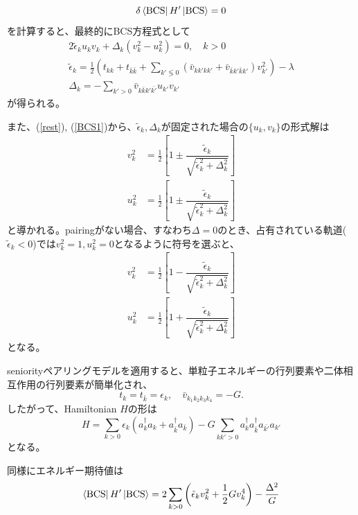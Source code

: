\documentclass[a4paper]{jsreport}
\newcommand{\BCSexp}[1]{\bra{\text{BCS}} {#1} \ket{\text{BCS}}}
\begin{document}
  \begin{equation}
      \delta\BCSexp{H'}=0
  \end{equation}
  を計算すると、最終的にBCS方程式として
  \begin{align}
      2\tilde{\epsilon}_ku_kv_k+\Delta_k(v_k^2-u_k^2)=0, \quad k>0\label{BCS1} \\
      \tilde{\epsilon}_k=\frac{1}{2}\left(t_{kk}+t_{\bar{k}\bar{k}}+\sum_{k'\lessgtr0}(\bar{v}_{kk'kk'}+\bar{v}_{\bar{k}k'\bar{k}k'})v_{k'}^2\right)-\lambda\\
      \Delta_k=-\sum_{k'>0}\bar{v}_{k\bar{k}k'\bar{k'}}u_{k'}v_{k'}\label{Delta1}
  \end{align}
  が得られる。\par
  また、(\ref{rest}), (\ref{BCS1})から、\(\tilde{\epsilon}_k, \Delta_k\)が固定された場合の\(\{u_k,v_k\}\)の形式解は
  \begin{align}
      v_k^2&=\frac{1}{2}\left[
        1\pm\dfrac{\tilde{\epsilon}_k}{\sqrt{\tilde{\epsilon}_k^2+\Delta_k^2}}
      \right]\\
      u_k^2&=\frac{1}{2}\left[
        1\pm\dfrac{\tilde{\epsilon}_k}{\sqrt{\tilde{\epsilon}_k^2+\Delta_k^2}}
      \right]
  \end{align}
  と導かれる。pairingがない場合、すなわち\(\Delta=0\)のとき、占有されている軌道(\(\tilde{\epsilon}_k<0\))では\(v_k^2=1, u_k^2=0\)となるように符号を選ぶと、
  \begin{align}
      v_k^2&=\frac{1}{2}\left[
        1-\dfrac{\tilde{\epsilon}_k}{\sqrt{\tilde{\epsilon}_k^2+\Delta_k^2}}
      \right]\\
      u_k^2&=\frac{1}{2}\left[
        1+\dfrac{\tilde{\epsilon}_k}{\sqrt{\tilde{\epsilon}_k^2+\Delta_k^2}}
      \right]
  \end{align}
  となる。\par
  seniorityペアリングモデルを適用すると、単粒子エネルギーの行列要素や二体相互作用の行列要素が簡単化され、
  \begin{equation}
      t_{k}=t_{\bar{k}}=\epsilon_k, \quad \bar{v}_{k_1k_2k_3k_4}=-G.
  \end{equation}
  したがって、Hamiltonian \(H\)の形は
  \begin{equation}
      H=\sum_{k>0}\epsilon_k(a^{\dagger}_ka_k+a^{\dagger}_{\bar{k}}a_{\bar{k}})-G\sum_{kk'>0}a^{\dagger}_ka^{\dagger}_{\bar{k}}a_{\bar{k'}}a_{k'}\label{Hamiltonian1}
  \end{equation}
  となる。\par
  同様にエネルギー期待値は
  \begin{equation}
      \BCSexp{H'}=2\sum_{k>0}\left(\tilde{\epsilon}_kv_k^2+\frac{1}{2}Gv_k^4\right)-\frac{\Delta^2}{G}
  \end{equation}
\end{document}
